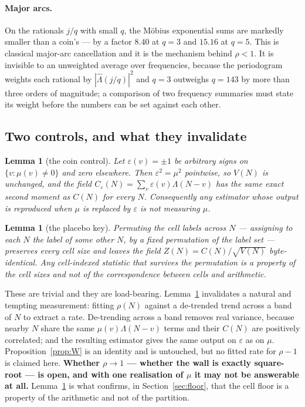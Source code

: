 \documentclass[11pt,a4paper]{article}
\theoremstyle{plain}
\newtheorem{lemma}[theorem]{Lemma}
\theoremstyle{definition}
\begin{document}
\paragraph{Major arcs.} On the rationals $j/q$ with small $q$, the
M\"obius exponential sums are markedly smaller than a coin's ---
by a factor $8.40$ at $q=3$ and $15.16$ at $q=5$. This is classical
major-arc cancellation and it is the mechanism behind $\rho<1$. It is
invisible to an unweighted average over frequencies, because the
periodogram weights each rational by $|\hat\Lambda(j/q)|^2$ and $q=3$
outweighs $q=143$ by more than three orders of magnitude; a comparison
of two frequency summaries must state its weight before the numbers can
be set against each other.

\subsection{Two controls, and what they invalidate}

\begin{lemma}[the coin control]\label{lem:coin}
Let $\varepsilon(v)=\pm1$ be arbitrary signs on $\{v : \mu(v)\neq0\}$
and zero elsewhere. Then $\varepsilon^2 = \mu^2$ pointwise, so
$V(N)$ is unchanged, and the field
$C_\varepsilon(N)=\sum_v\varepsilon(v)\Lambda(N-v)$ has the same exact
second moment as $C(N)$ for every $N$. Consequently any estimator whose
output is reproduced when $\mu$ is replaced by $\varepsilon$ is not
measuring $\mu$.
\end{lemma}

\begin{lemma}[the placebo key]\label{lem:placebo}
Permuting the cell labels across $N$ --- assigning to each $N$ the
label of some other $N$, by a fixed permutation of the label set ---
preserves every cell size and leaves the field $Z(N)=C(N)/\sqrt{V(N)}$
byte-identical. Any cell-indexed statistic that survives the
permutation is a property of the cell sizes and not of the
correspondence between cells and arithmetic.
\end{lemma}

These are trivial and they are load-bearing. Lemma~\ref{lem:coin}
invalidates a natural and tempting measurement: fitting $\rho(N)$
against a de-trended trend across a band of $N$ to extract a rate.
De-trending across a band removes real variance, because nearby $N$
share the same $\mu(v)\Lambda(N-v)$ terms and their $C(N)$ are
positively correlated; and the resulting estimator gives the same
output on $\varepsilon$ as on $\mu$. Proposition~\ref{prop:W} is an
identity and is untouched, but no fitted rate for $\rho-1$ is claimed
here. \textbf{Whether $\rho\to1$ --- whether the wall is exactly
square-root --- is open, and with one realisation of $\mu$ it may not
be answerable at all.} Lemma~\ref{lem:placebo} is what confirms, in
Section~\ref{sec:floor}, that the cell floor is a property of the
arithmetic and not of the partition.
\end{document}
